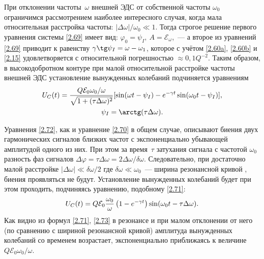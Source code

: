 При отклонении частоты~$\omega$ внешней ЭДС от собственной частоты $\omega_0$
ограничимся рассмотрением наиболее интересного случая, когда
мала относительная расстройка частоты: $|\Delta\omega|/\omega_0\ll 1$. 
Тогда строгое решение первого
уравнения системы \eqref{2.69} имеет вид:
$\varphi_0=\psi_I,~A =\mathcal{E}_{\omega}$,~--- а второе из уравнений
\eqref{2.69} приводит к равенству $\gamma\tg\psi_I=\omega-\omega_1$, которое с
учётом \eqref{2.60a}, \eqref{2.60b} и \eqref{2.15} удовлетворяется с относительной погрешностью
$\approx0,1Q^{-2}$. Таким образом, в высокодобротном контуре при малой
относительной расстройке частоты внешней ЭДС установление вынужденных колебаний
подчиняется уравнениям
\begin{equation}
	\eqmark{2.72}
	\begin{gathered}[c]
U_C(t)=\dfrac{Q\mathcal{E}_0\omega_0/\omega}{\sqrt{1+(\tau\Delta\omega)^2}}[
\sin(\omega t-\psi_I)-e^{-\gamma t}\sin(\omega_0t-\psi_I)],\\
		\psi_I=\arctg(\tau\Delta\omega).
	\end{gathered}
\end{equation}

Уравнения \eqref{2.72}, как и уравнение \eqref{2.70} в общем случае, описывают
биения двух гармонических сигналов близких частот с экспоненциально убывающей
амплитудой одного из них. При этом за время~$\tau$ затухания сигнала с частотой
$\omega_0$ разность фаз сигналов
$\Delta\varphi=\tau\Delta\omega=2\Delta\omega/\delta\omega$. Следовательно, при
достаточно малой расстройке
$|\Delta\omega|\ll\delta\omega/2$ 
где $\delta\omega \ll \omega_0$~--- ширина резонансной кривой , 
биения проявляться не будут. 
Установление вынужденных колебаний будет при этом проходить,
подчиняясь уравнению, подобному \eqref{2.71}:
\begin{equation}\eqmark{2.73}
	U_C(t)=Q\mathcal{E}_0\frac{\omega_0}{\omega}\left(1-e^{-\gamma
t}\right)\sin(\omega_0t-\tau\Delta\omega).
\end{equation}
Как видно из формул \eqref{2.71}, \eqref{2.73} в резонансе и при малом
отклонении от него (по сравнению с шириной резонансной кривой) амплитуда
вынужденных колебаний со временем возрастает, экспоненциально приближаясь 
к величине $Q\mathcal{E}_0\omega_0/\omega$.

